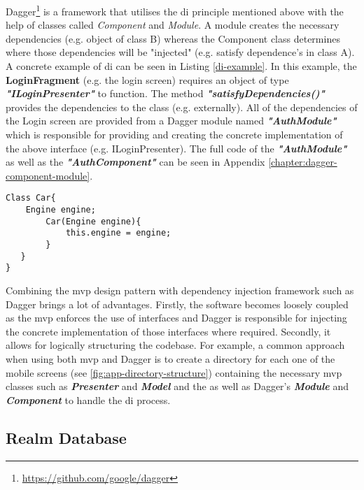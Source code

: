     Dagger\footnote{\url{https://github.com/google/dagger}} is a framework that utilises the \gls{di} principle mentioned above with the help of classes called  \textit{Component} and \textit{Module}. A module creates the necessary dependencies (e.g. object of class B) whereas the Component class determines where those dependencies will be "injected" (e.g. satisfy dependence's in class A). A concrete example of \gls{di} can be seen in Listing \ref{di-example}. In this example, the \textbf{LoginFragment} (e.g. the login screen) requires an object of type \textit{\textbf{"ILoginPresenter"}} to function. The method \textit{\textbf{"satisfyDependencies()"}} provides the dependencies to the class (e.g. externally). All of the dependencies of the Login screen are provided from a Dagger module named \textit{\textbf{"AuthModule"}} which is responsible for providing and creating the concrete implementation of the above interface (e.g. ILoginPresenter). The full code of the \textit{\textbf{"AuthModule"}} as well as the \textit{\textbf{"AuthComponent"}} can be seen in Appendix \ref{chapter:dagger-component-module}.    
    
\begin{lstlisting}[caption= DI example, label=di-car-example,frame=tlrbr,basicstyle=\small,captionpos=b]
   Class Car{
    Engine engine;
        Car(Engine engine){
            this.engine = engine;
        }
   }
}
\end{lstlisting}
        
    Combining the \gls{mvp} design pattern with dependency injection framework such as Dagger brings a lot of advantages. Firstly, the software becomes loosely coupled as the \gls{mvp} enforces the use of interfaces and Dagger is responsible for injecting the concrete implementation of those interfaces where required. Secondly, it allows for logically structuring the codebase. For example, a common approach when using both \gls{mvp} and Dagger is to create a directory for each one of the mobile screens (see \ref{fig:app-directory-structure}) containing the necessary \gls{mvp} classes such as \textit{\textbf{Presenter}} and \textit{\textbf{Model}} and the as well as Dagger's \textit{\textbf{Module}} and \textit{\textbf{Component}} to handle the \gls{di} process.
    
   
    
    \subsection{Realm Database}
    
